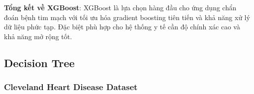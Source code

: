 \textbf{Tổng kết về XGBoost}: XGBoost là lựa chọn hàng đầu cho ứng dụng chẩn đoán bệnh tim mạch với tối ưu hóa gradient boosting tiên tiến và khả năng xử lý dữ liệu phức tạp. Đặc biệt phù hợp cho hệ thống y tế cần độ chính xác cao và khả năng mở rộng tốt.

\FloatBarrier

\subsection{Decision Tree}\label{subsec:decision-tree}

\subsubsection{Cleveland Heart Disease Dataset}\label{subsubsec:dt-cleveland}

